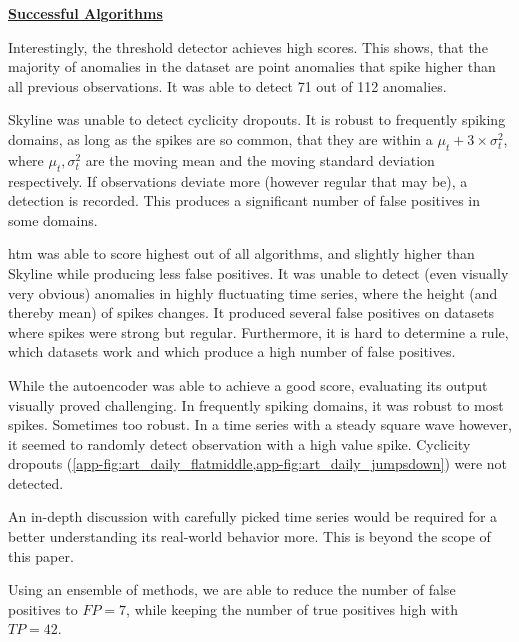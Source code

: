 \bigskip
{\large\uline{\textbf{Successful Algorithms}}}\\
\begin{description}[style=unboxed,leftmargin=0cm]
    \item[Threshold Detector] Interestingly, the threshold detector achieves high scores.
    This shows, that the majority of anomalies in the dataset are point anomalies 
    that spike higher than all previous observations. It was able to detect
    71 out of 112 anomalies.
    \item[Skyline] Skyline was unable to detect cyclicity dropouts. It is robust
    to frequently spiking domains, as long as the spikes are so common, that
    they are within a \(\mu_t + 3 \times \sigma_t^2\), where \(\mu_t, \sigma_t^2\) 
    are the moving mean and the moving standard deviation respectively. If observations
    deviate more (however regular that may be), a detection is recorded.
    This produces a significant number of false positives in some domains.
    \item[Numenta HTM] \gls{htm} was able to score highest out of all algorithms,
    and slightly higher than Skyline while producing less false positives. It
    was unable to detect (even visually very obvious) anomalies in highly
    fluctuating time series, where the height (and thereby mean) of spikes
    changes. It produced several false positives on datasets where spikes were
    strong but regular. Furthermore, it is hard to determine a rule, which datasets
    work and which produce a high number of false positives.

    \item[AutoEncoder] While the autoencoder was able to achieve a good score,
    evaluating its output visually proved challenging. In frequently spiking
    domains, it was robust to most spikes. Sometimes too robust. In a time series with a
    steady square wave however, it seemed to randomly detect observation with a
    high value spike. Cyclicity dropouts (\cref{app-fig:art_daily_flatmiddle,app-fig:art_daily_jumpsdown})
    were not detected.
    
    An in-depth discussion with carefully picked time series would be required for
    a better understanding its real-world behavior more. This is beyond the scope
    of this paper.
    \item[Ensemble of HTM, Threshold and Autoencoder] Using an ensemble of methods,
    we are able to reduce the number of false positives to \(FP=7\), while
    keeping the number of true positives high with \(TP=42\).
\end{description}

